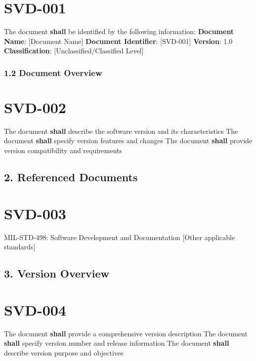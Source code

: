 \section{SVD-001}\label{SVD-001}

The document \textbf{shall} be identified by the following information:
\textbf{Document Name}: [Document Name]
\textbf{Document Identifier}: [SVD-001]
\textbf{Version}: 1.0
\textbf{Classification}: [Unclassified/Classified Level]

\subsubsection{1.2 Document Overview}

\section{SVD-002}\label{SVD-002}

The document \textbf{shall} describe the software version and its characteristics
The document \textbf{shall} specify version features and changes
The document \textbf{shall} provide version compatibility and requirements

\subsection{2. Referenced Documents}

\section{SVD-003}\label{SVD-003}

MIL-STD-498: Software Development and Documentation
[Other applicable standards]\\

\subsection{3. Version Overview}

\section{SVD-004}\label{SVD-004}

The document \textbf{shall} provide a comprehensive version description
The document \textbf{shall} specify version number and release information
The document \textbf{shall} describe version purpose and objectives

